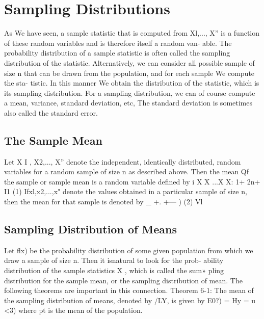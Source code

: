 \section{Sampling Distributions}
As We have seen, a sample statistic that is computed from Xl,..., X” is a
function of these random variables and is therefore itself a random van-
able. The probability distribution of a sample statistic is often called the
sampling distribution of the statistic.
Alternatively, we can consider all possible sample of size n that can
be drawn from the population, and for each sample We compute the sta-
tistic. In this manner We obtain the distribution of the statistic, which is
its sampling distribution.
For a sampling distribution, we can of course compute a mean,
variance, standard deviation, etc, The standard deviation is sometimes
also called the standard error.


\subsection{The Sample Mean}
Let X I , X2,..., X” denote the independent, identically distributed, random
variables for a random sample of size n as described above. Then the
mean Qf the sample or sample mean is a random variable deﬁned by
i X X ...X
X: 1+ 2n+ I1 (1)
Ifxl,x2,...,x" denote the values obtained in a particular sample of size n,
then the mean for that sample is denoted by
_ +. +---
)  (2)
Vl

\subsection{Sampling Distribution of Means}
Let ﬂx) be the probability distribution of some given population from
which we draw a sample of size n. Then it isnatural to look for the prob-
ability distribution of the sample statistics X , which is called the sum»
pling distribution for the sample mean, or the sampling distribution of
mean. The following theorems are important in this connection.
Theorem 6-1: The mean of the sampling distribution of means,
denoted by /LY, is given by
E0?) = Hy = u <3)
where pt is the mean of the population.


